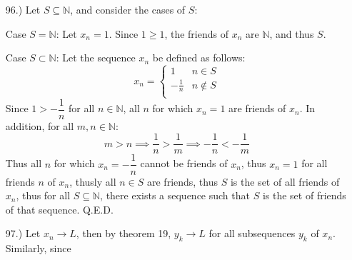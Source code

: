 \documentclass[12pt]{article}
\begin{document}
\begin{itemize}









    \item [96.)] Let $S\subseteq\mathbb{N}$, and consider the cases of $S$:

    Case $S=\mathbb N$: Let $x_n=1$. Since $1\geq 1$, the friends of $x_n$ are $\mathbb{N}$, and thus $S$.

    Case $S\subset\mathbb{N}$: Let the sequence $x_n$ be defined as follows:
    \[x_n=\begin{cases}
        1 & n\in S \\
        -\frac{1}{n} & n\notin S \\
    \end{cases}\]
    Since $1>-\dfrac{1}{n}$ for all $n\in\mathbb{N}$, all $n$ for which $x_n=1$ are friends of $x_n$. In addition, for all $m,n\in\mathbb{N}$:
    \[m>n\implies\dfrac{1}{n}>\dfrac{1}{m}\implies-\dfrac{1}{n}<-\frac{1}{m}\]
    Thus all $n$ for which $x_n=-\dfrac{1}{n}$ cannot be friends of $x_n$, thus $x_n=1$ for all friends $n$ of $x_n$, thusly all $n\in S$ are friends, thus $S$ is the set of all friends of $x_n$, thus for all $S\subseteq\mathbb{N}$, there exists a sequence such that $S$ is the set of friends of that sequence. Q.E.D.

    \item [97.)] Let $x_n\to L$, then by theorem 19, $y_k\to L$ for all subsequences $y_k$ of $x_n$. Similarly, since


\end{itemize}
\end{document}
